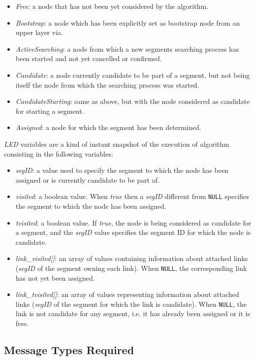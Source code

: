 \begin{itemize}
\item{\emph{Free}}: a node that has not been yet considered by the \disr{} algorithm.
\item{\emph{Bootstrap}}: a node which has been explicitly set as bootstrap node from
an upper layer via. 
\item{\emph{ActiveSearching}}: a node from which a new segments searching process has
been started and not yet cancelled or confirmed. 
\item{\emph{Candidate}}: a node currently candidate to be part of a segment, but not 
being itself the node from which the searching process was started. 
\item{\emph{CandidateStarting}}: same as above, but with the node considered as candidate
for starting a segment. 
\item{\emph{Assigned}}: a node for which the segment has been determined.
\end{itemize}

\emph{LED} variables are a kind of instant snapshot of the execution of \disr{} algorithm
consisting in the following variables:

\begin{itemize}
\item{\emph{segID}}: a value used to specify the segment to which the
node has been assigned or is currently candidate to be part of.
\item{\emph{visited}}: a boolean value. When \emph{true}
then a \emph{segID} different from \texttt{NULL} specifies the segment 
to which the node has been assigned. 
\item{\emph{tvisited}}: a boolean value. If \emph{true}, the node is
being considered as candidate for a segment, and the \emph{segID} value
specifies the segment ID for which the node is candidate. 
\item{\emph{link\_visited[]}}: an array
of values containing information about attached links (\emph{segID} of the segment 
owning each link). When \texttt{NULL}, the corresponding link has not yet been
assigned.
\item{\emph{link\_tvisited[]}}: an array of
values representing information about attached links (\emph{segID} of
the segment for which the link is candidate). When \texttt{NULL}, the link is
not candidate for any segment, i.e. it has already been assigned or it is free.
\end{itemize}

\subsection{Message Types Required}

